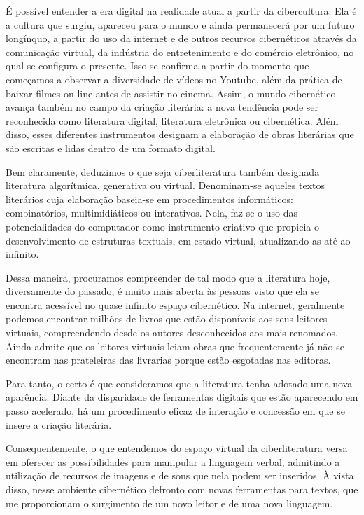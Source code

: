 \begin{refsection}
    É possível  entender a era digital na realidade atual a partir da cibercultura.  Ela é a cultura que surgiu, apareceu para o mundo e ainda permanecerá por um futuro longínquo, a partir do uso da internet e de outros recursos cibernéticos através da comunicação virtual, da indústria do entretenimento e do comércio eletrônico, no qual se configura o presente. Isso se confirma a partir do momento que começamos a observar a diversidade de vídeos no Youtube, além da prática de baixar filmes on-line antes de assistir no cinema. Assim, o mundo cibernético avança também no campo da criação literária: a  nova tendência pode ser reconhecida como literatura digital, literatura eletrônica ou cibernética. Além disso, esses diferentes instrumentos designam  a elaboração de obras literárias que são escritas e lidas dentro de um formato digital. 

    Bem claramente, deduzimos o que seja ciberliteratura também designada literatura algorítmica, generativa ou virtual. Denominam-se aqueles textos literários cuja elaboração baseia-se em procedimentos informáticos: combinatórios, multimidiáticos ou interativos. Nela, faz-se o uso das potencialidades do computador como instrumento criativo que propicia o desenvolvimento de estruturas textuais, em estado virtual, atualizando-as até ao infinito.  

    Dessa maneira, procuramos compreender de tal modo que a literatura hoje, diversamente do passado, é muito mais aberta às pessoas visto que ela se encontra acessível no quase infinito espaço cibernético. Na internet, geralmente podemos encontrar milhões de livros que estão disponíveis aos seus leitores virtuais, compreendendo desde os autores desconhecidos aos mais renomados. Ainda admite que os leitores virtuais leiam obras que frequentemente já não se encontram nas prateleiras das livrarias porque estão esgotadas nas editoras.  

    Para tanto, o certo é que consideramos que a literatura tenha adotado uma nova aparência. Diante da disparidade de ferramentas digitais que estão aparecendo em passo acelerado, há um procedimento eficaz de interação e concessão em que se insere a criação literária. 

    Consequentemente, o que entendemos do espaço virtual da ciberliteratura versa em oferecer as possibilidades para manipular a linguagem verbal, admitindo a utilização de recursos de imagens e de sons que nela podem ser inseridos. À vista disso, nesse ambiente cibernético defronto com novas ferramentas para textos, que me proporcionam o surgimento de um novo leitor e de uma nova linguagem.  


\end{refsection}
